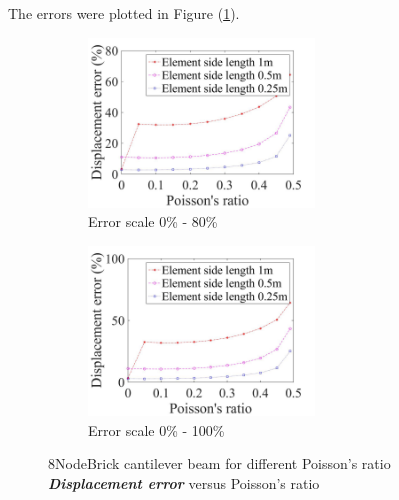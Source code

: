 \documentclass[fleqn,11pt,letter]{article}
\begin{document}
The errors were plotted in Figure (\ref{fig error 8NodeBrick cantilever beam for different Poisson's ratio}).
\begin{figure}[H]
  \begin{subfigure}{0.5\textwidth}
    \centering
    \includegraphics[width=6cm]{../Figure_files/8NodeBrick/error8brick_beam_different_poisson_ratio_disp_div.jpeg}
    \caption{Error scale 0\% - 80\%}
  \end{subfigure}
  \begin{subfigure}{0.5\textwidth}
    \centering
    \includegraphics[width=6cm]{../Figure_files/8NodeBrick/error8brick_beam_different_poisson_ratio_disp_div100.jpeg}
    \caption{Error scale 0\% - 100\%}
  \end{subfigure}
  \captionsetup{justification=centering,margin=3cm}
  \caption{8NodeBrick cantilever beam for different Poisson's ratio\\
      \emph{\textbf{Displacement error}}   versus   Poisson's ratio}
  \label{fig error 8NodeBrick cantilever beam for different Poisson's ratio}
\end{figure}
\end{document}
